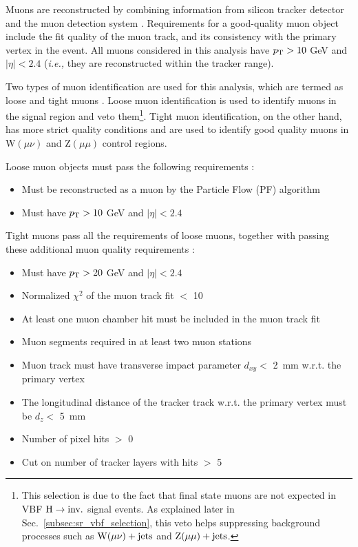 Muons are reconstructed by combining information from silicon tracker detector and the muon detection system
\cite{cms:muon_paper}. Requirements for a good-quality muon object include the fit quality of the
muon track, and its consistency with the primary vertex in the event. All muons considered in this
analysis have $p_{\textrm{T}} > 10$ GeV and $|\eta| < 2.4$ (\textit{i.e.,} they are reconstructed within the tracker range).

Two types of muon identification are used for this analysis, which are termed as loose and tight muons \cite{CMS-MUO-TWIKI-IDLOOSE,CMS-MUO-TWIKI-IDTIGHT}.
Loose muon identification is used to identify muons in the signal region and veto them\footnote{This selection is due to the fact that
final state muons are not expected in VBF $\textrm{H} \rightarrow \textrm{inv.}$ signal events. As explained later in Sec.~\ref{subsec:sr_vbf_selection}, this veto
helps suppressing background processes such as $\textrm{W}(\mu\nu)+\textrm{jets}$ and $\mathrm{Z}(\mu\mu)+\textrm{jets}$.}. 
Tight muon identification, on the other hand,
has more strict quality conditions and are used to identify good quality muons in $\textrm{W}(\mu \nu)$ and $\textrm{Z}(\mu \mu)$ control regions.

Loose muon objects must pass the following requirements \cite{CMS-MUO-TWIKI-IDLOOSE}:

\begin{itemize}
    \item Must be reconstructed as a muon by the Particle Flow (PF) algorithm
    \item Must have $p_{\textrm{T}} > 10$ GeV and $|\eta| < 2.4$
\end{itemize}

Tight muons pass all the requirements of loose muons, together with passing these additional muon quality requirements \cite{CMS-MUO-TWIKI-IDTIGHT}:

\begin{itemize}
    \item Must have $p_{\textrm{T}} > 20$ GeV and $|\eta| < 2.4$
    \item Normalized $\chi^2$ of the muon track fit $<$ 10
    \item At least one muon chamber hit must be included in the muon track fit
    \item Muon segments required in at least two muon stations
    \item Muon track must have transverse impact parameter $d_{xy} < $ 2~mm w.r.t. the primary vertex
    \item The longitudinal distance of the tracker track w.r.t. the primary vertex must be $d_z < $ 5~mm
    \item Number of pixel hits $>$ 0
    \item Cut on number of tracker layers with hits $>$ 5
\end{itemize}

